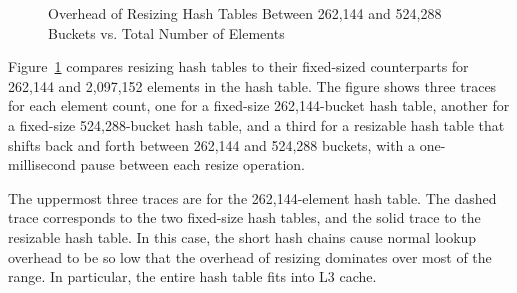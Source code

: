 \begin{figure}[tb]
\centering
{}
\caption{Overhead of Resizing Hash Tables Between 262,144 and 524,288 Buckets vs. Total Number of Elements}
\label{fig:datastruct:Overhead of Resizing Hash Tables Between 262,144 and 524,288 Buckets vs. Total Number of Elements}
\end{figure}

Figure~\ref{fig:datastruct:Overhead of Resizing Hash Tables Between 262,144 and 524,288 Buckets vs. Total Number of Elements}
compares resizing hash tables to their fixed-sized counterparts
for 262,144 and 2,097,152 elements in the hash table.
The figure shows three traces for each element count, one
for a fixed-size 262,144-bucket hash table, another for a
fixed-size 524,288-bucket hash table, and a third for a resizable
hash table that shifts back and forth between 262,144 and 524,288
buckets, with a one-millisecond pause between each resize operation.

The uppermost three traces are for the 262,144-element hash table.
The dashed trace corresponds to the two fixed-size hash tables,
and the solid trace to the resizable hash table.
In this case, the short hash chains cause normal lookup overhead
to be so low that the overhead of resizing dominates over most
of the range.
In particular, the entire hash table fits into L3 cache.

